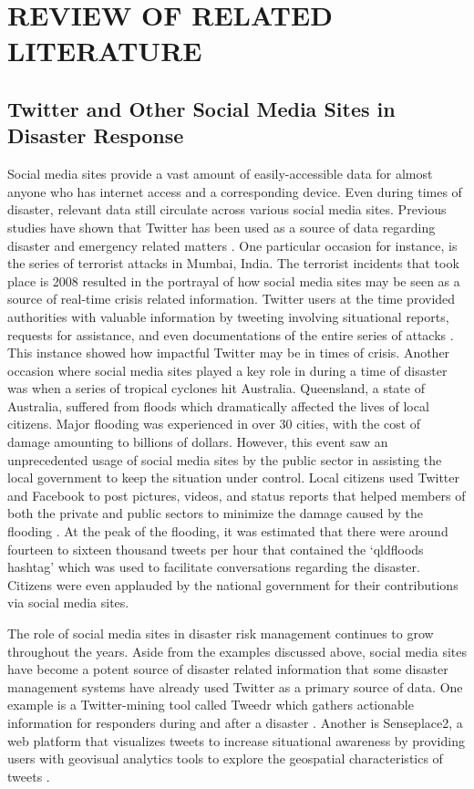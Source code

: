 \chapter{REVIEW OF RELATED LITERATURE}


\section{Twitter and Other Social Media Sites in Disaster Response}
Social media sites provide a vast amount of easily-accessible data for almost anyone who has internet access and a corresponding device. Even during times of disaster, relevant data still circulate across various social media sites. Previous studies have shown that Twitter has been used as a source of data regarding disaster and emergency related matters \cite{GOOLSBY2010, MCDOUGALL2011, VICTORINOESTUARLAGMAY2016, ROSALES2017, VELASCOBERMEJODOMINGO2018}. One particular occasion for instance, is the series of terrorist attacks in Mumbai, India. The terrorist incidents that took place is 2008 resulted in the portrayal of how social media sites may be seen as a source of real-time crisis related information. Twitter users at the time provided authorities with valuable information by tweeting involving situational reports, requests for assistance, and even documentations of the entire series of attacks \cite{GOOLSBY2010}. This instance showed how impactful Twitter may be in times of crisis. Another occasion where social media sites played a key role in during a time of disaster was when a series of tropical cyclones hit Australia. Queensland, a state of Australia, suffered from floods which dramatically affected the lives of local citizens. Major flooding was experienced in over 30 cities, with the cost of damage amounting to billions of dollars. However, this event saw an unprecedented usage of social media sites by the public sector in assisting the local government to keep the situation under control. Local citizens used Twitter and Facebook to post pictures, videos, and status reports that helped members of both the private and public sectors to minimize the damage caused by the flooding \cite{MCDOUGALL2011}. At the peak of the flooding, it was estimated that there were around fourteen to sixteen thousand tweets per hour that contained the ‘qldfloods hashtag’ which was used to facilitate conversations regarding the disaster. Citizens were even applauded by the national government for their contributions via social media sites.

The role of social media sites in disaster risk management continues to grow throughout the years. Aside from the examples discussed above, social media sites have become a potent source of disaster related information that some disaster management systems have already used Twitter as a primary source of data. One example is a Twitter-mining tool called Tweedr which gathers actionable information for responders during and after a disaster \cite{ASHKTORABBROWNNANDICULOTTA2014}. Another is Senseplace2, a web platform that visualizes tweets to increase situational awareness by providing users with geovisual analytics tools to explore the geospatial characteristics of tweets \cite{HSMM2015}. 

